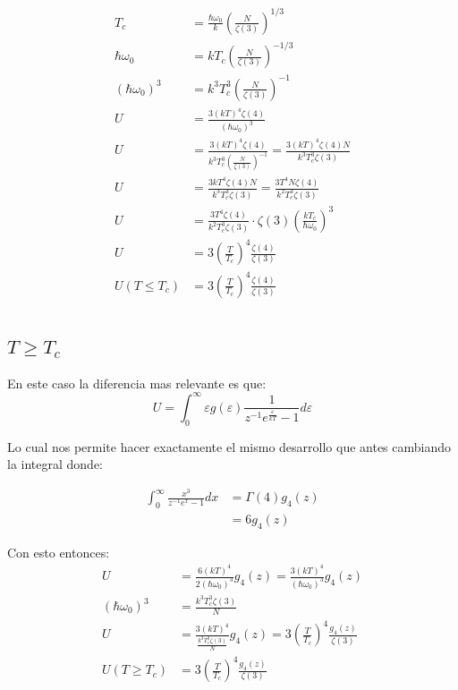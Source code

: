 \documentclass{report}
\begin{document}
\begin{align*}
  T_c &= \frac{\hbar \omega_0}{k} \left( \frac{N}{\zeta(3)} \right)^{1/3}\\
   \hbar \omega_0 &= k T_c \left( \frac{N}{\zeta(3)} \right)^{-1/3}\\
   (\hbar \omega_0)^3 &= k^3 T_c^3 \left( \frac{N}{\zeta(3)} \right)^{-1}\\
   U &= \frac{3 (kT)^4 \zeta(4)}{(\hbar \omega_0)^3}\\
   U &= \frac{3 (kT)^4 \zeta(4)}{k^3 T_c^3 \left( \frac{N}{\zeta(3)} \right)^{-1}} = \frac{3 (kT)^4 \zeta(4) N}{k^3 T_c^3 \zeta(3)}\\
   U &= \frac{3 k T^4 \zeta(4) N}{k^3 T_c^3 \zeta(3)} = \frac{3 T^4 N \zeta(4)}{k^2 T_c^3 \zeta(3)}\\
   U &= \frac{3 T^4 \zeta(4)}{k^2 T_c^3 \zeta(3)} \cdot \zeta(3) \left( \frac{k T_c}{\hbar \omega_0} \right)^3\\
   U &= 3 \left( \frac{T}{T_c} \right)^4 \frac{\zeta(4)}{\zeta(3)}\\
  U(T \leq T_c) &= 3 \left( \frac{T}{T_c} \right)^4 \frac{\zeta(4)}{\zeta(3)}\\
\end{align*}

\subsection{$T \ge T_c$}

En este caso la diferencia mas relevante es que:
\[
  U = \int_0^\infty \varepsilon g(\varepsilon) \frac{1}{z^{-1}e^{\frac{\varepsilon}{kT}} - 1} d\varepsilon
\]

Lo cual nos permite hacer exactamente el mismo desarrollo que antes cambiando la integral donde:

\begin{align*}
  \int_0^\infty \frac{x^3}{z^{-1} e^x - 1} dx &= \Gamma(4)g_4(z)\\
  &= 6 g_4 (z)
\end{align*}

Con esto entonces: 
\begin{align*}
  U &= \frac{6 (kT)^4}{2(\hbar \omega_0)^3} g_4(z) = \frac{3 (kT)^4}{(\hbar \omega_0)^3} g_4(z)\\
   (\hbar \omega_0)^3 &= \frac{k^3 T_c^3 \zeta(3)}{N}\\
   U &= \frac{3 (kT)^4}{\frac{k^3 T_c^3 \zeta(3)}{N}} g_4(z) = 3 \left( \frac{T}{T_c} \right)^4 \frac{g_4(z)}{\zeta(3)}\\
   U(T \geq T_c) &= 3 \left( \frac{T}{T_c} \right)^4 \frac{g_4(z)}{\zeta(3)}\\
\end{align*}
\end{document}
